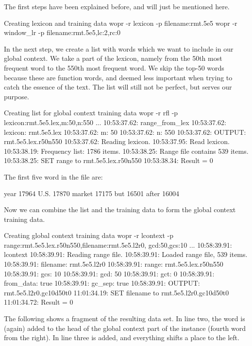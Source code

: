 \documentclass[a4paper,10pt,twoside]{report}
\begin{document}
The first steps have been explained before, and will just be mentioned
here.

\begin{bash}{Creating lexicon and training data}
wopr -r lexicon -p filename:rmt.5e5
wopr -r window_lr -p filename:rmt.5e5,lc:2,rc:0
\end{bash}

In the next step, we create a list with words which we want to include
in our global context. We take a part of the lexicon, namely from the
50th most frequent word to the 550th most frequent word. We skip the
top-50 words because these are function words, and deemed less
important when trying to catch the essence of the text. The list will
still not be perfect, but serves our purpose.

\begin{bash}{Creating list for global context training data}
wopr -r rfl -p lexicon:rmt.5e5.lex,m:50,n:550
...
10:53:37.62: range_from_lex
10:53:37.62:  lexicon: rmt.5e5.lex
10:53:37.62:  m:       50
10:53:37.62:  n:       550
10:53:37.62:  OUTPUT:  rmt.5e5.lex.r50n550
10:53:37.62: Reading lexicon.
10:53:37.95: Read lexicon.
10:53:38.19: Frequency list: 1786 items.
10:53:38.25: Range file contains 539 items.
10:53:38.25: SET range to rmt.5e5.lex.r50n550
10:53:38.34: Result = 0
\end{bash}

The first five word in the file are:

\begin{wout}{}
year 17964
U.S. 17870
market 17175
but 16501
after 16004
\end{wout}

Now we can combine the list and the training data to form the global
context training data.

\begin{bash}{Creating global context training data}
wopr -r lcontext -p range:rmt.5e5.lex.r50n550,filename:rmt.5e5.l2r0,
                    gcd:50,gcs:10
...
10:58:39.91: lcontext
10:58:39.91: Reading range file.
10:58:39.91: Loaded range file, 539 items.
10:58:39.91:  filename:  rmt.5e5.l2r0
10:58:39.91:  range:     rmt.5e5.lex.r50n550
10:58:39.91:  gcs:       10
10:58:39.91:  gcd:       50
10:58:39.91:  gct:       0
10:58:39.91:  from_data: true
10:58:39.91:  gc_sep:    true
10:58:39.91:  OUTPUT:    rmt.5e5.l2r0.gc10d50t0
11:01:34.19: SET filename to rmt.5e5.l2r0.gc10d50t0
11:01:34.72: Result = 0
\end{bash}

The following shows a fragment of the resulting data set. In line two,
the word  is (again) added to the head of the global context
part of the instance (fourth word from the right). In line three 
is added, and everything shifts a place to the left.
\end{document}
